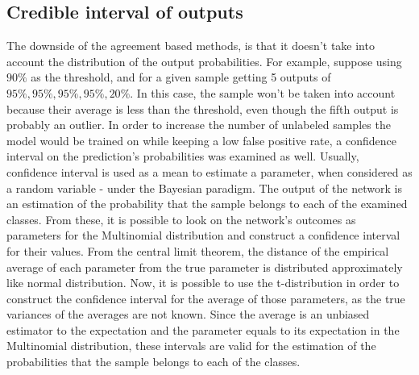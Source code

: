 \documentclass[conference, letterpaper]{IEEEtran}
\begin{document}
\subsection{Credible interval of outputs}
The downside of the agreement based methods, is that it doesn't take into account the distribution of the output probabilities. For example, suppose using $90\%$ as the threshold, and for a given sample getting 5 outputs of $95\%,95\%,95\%,95\%,20\%$. In this case, the sample won't be taken into account because their average is less than the threshold, even though the fifth output is probably an outlier. 
 In order to increase the number of unlabeled samples the model would be trained on while keeping a low false positive rate, a confidence interval on the prediction's probabilities was examined as well.
 Usually, confidence interval is used as a mean to estimate a parameter, when considered as a random variable - under the Bayesian paradigm. The output of the network is an estimation of the probability that the sample belongs to each of the examined classes. From these, it is possible to look on the network's outcomes as parameters for the  Multinomial distribution and construct a confidence interval for their values. From the central limit theorem, the distance of the empirical average of each parameter from the true parameter is distributed approximately like normal distribution. Now, it is possible to use the t-distribution in order to construct the confidence interval for the average of those parameters, as the true variances of the averages are not known. Since the average is an unbiased estimator to the expectation and the parameter equals to its expectation in the Multinomial distribution, these intervals are valid for the estimation of the probabilities that the sample belongs to each of the classes.\\
\end{document}
